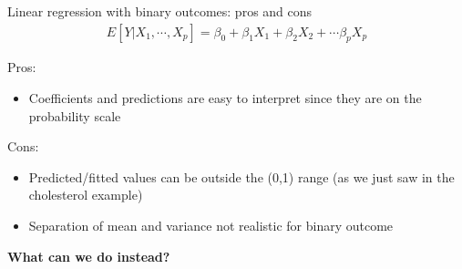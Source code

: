 \documentclass[10pt,t]{beamer}
\begin{document}
\begin{frame}{Linear regression with binary outcomes: pros and cons}
	\begin{align*} 
		E[Y|X_1,\cdots,X_p] = \beta_0 + \beta_1 X_1 + \beta_2 X_2 + \cdots \beta_p X_p 
	\end{align*}
	
	Pros: 
	\begin{itemize}
		\item Coefficients and predictions are easy to interpret since they are on the probability scale
	\end{itemize}
	
	Cons: 
	\begin{itemize}
		\item Predicted/fitted values can be outside the (0,1) range (as we just saw in the cholesterol example)
		\item Separation of mean and variance not realistic for binary outcome
	\end{itemize}
	
	\textbf{What can we do instead?}
\end{frame}
\end{document}
